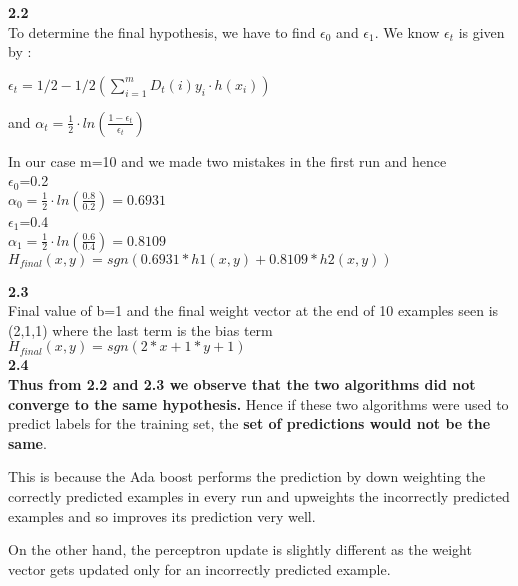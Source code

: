 \documentclass[11pt]{article}
\begin{document}
\begin{itemize}
\textbf{2.2}\\


To determine the final hypothesis, we have to find $\epsilon{}_0$ and $\epsilon{}_1$. We know $\epsilon{}_t$ is given by :

$\epsilon{}_t = 1/2 - 1/2(\sum_{i=1}^{m} D_t(i) y_i \cdot h({x_i}))$

and $\alpha{}_t = \frac{1}{2} \cdot  ln (\frac{ 1-\epsilon{}_t}{\epsilon{}_t} )$

In our case m=10 and we made two mistakes in the first run and hence \\
$\epsilon{}_0$=0.2\\
$\alpha{}_0=\frac{1}{2}  \cdot ln(\frac{0.8}{0.2}) = 0.6931$\\
$\epsilon{}_1$=0.4\\
$\alpha{}_1=\frac{1}{2}  \cdot ln(\frac{0.6}{0.4}) =0.8109$\\
$\boxed{H_{final}(x,y)=sgn(0.6931*h1(x,y) + 0.8109*h2(x,y) )}$

\textbf{2.3}\\
Final value of b=1 and the final weight vector at the end of 10 examples seen is (2,1,1) where the last term is the bias term\\
$\boxed{H_{final}(x,y)=sgn( 2*x + 1*y +1 )}$\\

\textbf{2.4}\\

\textbf{Thus from 2.2 and 2.3 we observe that the two algorithms did not converge to the same hypothesis.} Hence if these two algorithms were used to predict labels for the training set, the \textbf{set of predictions would not be the same}.

This is because the Ada boost performs the prediction by down weighting the correctly predicted examples in every run and upweights the incorrectly predicted examples and so improves its prediction very well.

On the other hand, the perceptron update is slightly different as the weight vector gets updated only for an incorrectly predicted example.


\end{itemize}
\end{document}
